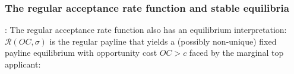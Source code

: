 \documentclass[12pt,reqno]{amsart}
\theoremstyle{definition}
\theoremstyle{plain} %
\begin{document}

\subsubsection{The regular acceptance rate function and stable equilibria}: The regular acceptance rate function also has an equilibrium interpretation: $\mathcal{R}(OC,\sigma)$ is the regular payline that yields a (possibly non-unique) fixed payline equilibrium with opportunity cost $OC>c$ faced by the marginal top applicant:
\end{document}

